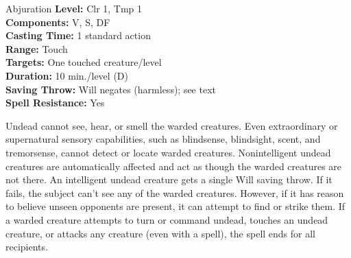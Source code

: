 {Abjuration}
{
	\textbf{Level:}
	Clr 1, Tmp 1\\
	\textbf{Components:}
	V, S, DF\\
	\textbf{Casting Time:}
	1 standard action\\
	\textbf{Range:}
	Touch\\
	\textbf{Targets:}
	One touched creature/level\\
	\textbf{Duration:}
	10 min./level (D)\\
	\textbf{Saving Throw:}
	Will negates (harmless); see text\\
	\textbf{Spell Resistance:}
	Yes\\
}
{
	Undead cannot see, hear, or smell the warded creatures. Even extraordinary or supernatural sensory capabilities, such as blindsense, blindsight, scent, and tremorsense, cannot detect or locate warded creatures. Nonintelligent undead creatures are automatically affected and act as though the warded creatures are not there. An intelligent undead creature gets a single Will saving throw. If it fails, the subject can't see any of the warded creatures. However, if it has reason to believe unseen opponents are present, it can attempt to find or strike them. If a warded creature attempts to turn or command undead, touches an undead creature, or attacks any creature (even with a spell), the spell ends for all recipients.

}
